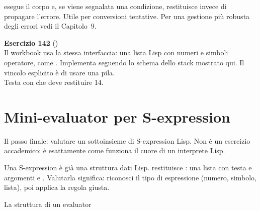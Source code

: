 \begin{nota}
 esegue il corpo e, se viene segnalata
una condizione, restituisce  invece di propagare
l'errore. Utile per conversioni tentative.
Per una gestione più robusta degli errori vedi il Capitolo~9.
\end{nota}

\begin{workbook}
\textbf{Esercizio 142} ()\\[4pt]
Il workbook usa la stessa interfaccia: una lista Lisp
con numeri e simboli operatore, come .
Implementa  seguendo lo schema dello stack
mostrato qui. Il vincolo esplicito è di usare una pila.\\[4pt]
Testa con 
che deve restituire 14.
\end{workbook}

\section{Mini-evaluator per S-expression}

Il passo finale: valutare un sottoinsieme di S-expression Lisp.
Non è un esercizio accademico: è esattamente come funziona
il cuore di un interprete Lisp.

\begin{intuizione}
Una S-expression è già una struttura dati Lisp.
 restituisce
: una lista con testa \fn{+} e argomenti
 e .
Valutarla significa: riconosci il tipo di espressione
(numero, simbolo, lista), poi applica la regola giusta.
\end{intuizione}

\begin{concetto}{La struttura di un evaluator}
\end{concetto}

